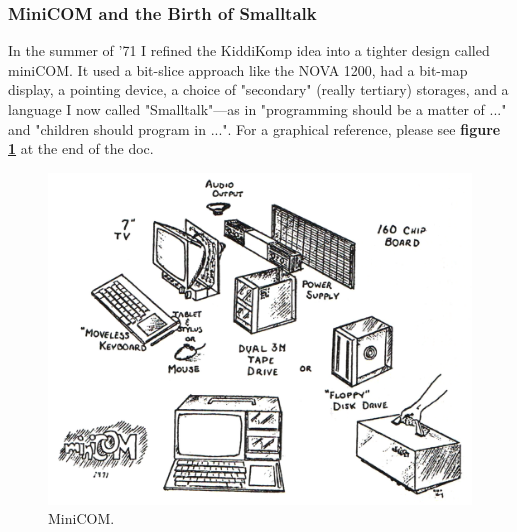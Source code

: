 \documentclass[letterpaper,12pt,parskip=full]{article}
\begin{document}
\subsubsection{MiniCOM and the Birth of Smalltalk}

In the summer of '71 I refined the KiddiKomp idea into a tighter design called miniCOM. It used a bit-slice approach like the NOVA 1200, had a bit-map display, a pointing device, a choice of "secondary" (really tertiary) storages, and a language I now called "Smalltalk"—as in "programming should be a matter of ..." and "children should program in ...". For a graphical reference, please see \textbf{figure \ref{fig:minicom}} at the end of the doc.

\begin{figure}[ht]
        \centering \includegraphics[scale=0.5]{MINICOM.png}
        \caption{
                \label{fig:minicom} %
                MiniCOM.
        }
\end{figure}
\end{document}
